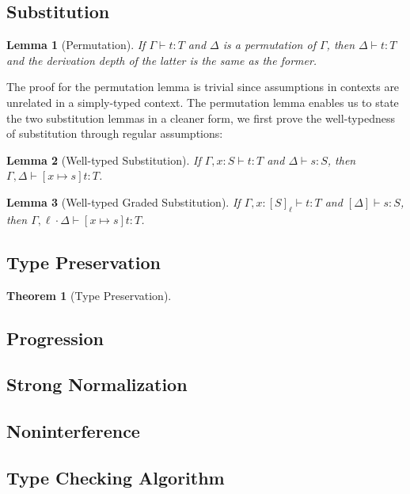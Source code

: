 \documentclass[conference]{IEEEtran}
\newtheorem{theorem}{Theorem}
\newtheorem{lemma}{Lemma}
\begin{document}
\subsection{Substitution}
\label{lem-perm}
\begin{lemma}[Permutation]
	If $\Gamma\vdash t:T$ and $\Delta$ is a permutation of $\Gamma$, then $\Delta\vdash t:T$ and the derivation depth of the latter is the same as the former.
\end{lemma}
The proof for the permutation lemma is trivial since assumptions in contexts are unrelated in a simply-typed context. The permutation lemma enables us to state the two substitution lemmas in a cleaner form, we first prove the well-typedness of substitution through regular assumptions:
\begin{lemma}[Well-typed Substitution] 
	If $\Gamma,x:S\vdash t:T$ and $\Delta\vdash s:S$, then $\Gamma,\Delta\vdash [x\mapsto s]t:T$.
\end{lemma}

\begin{lemma}[Well-typed Graded Substitution] 
	If $\Gamma,x:[S]_\ell\vdash t:T$ and $[\Delta]\vdash s:S$, then $\Gamma,\ell\cdot\Delta\vdash [x\mapsto s]t:T$.
\end{lemma}

\subsection{Type Preservation}
\label{thm-pre}
\begin{theorem}[Type Preservation]
	
\end{theorem}

\subsection{Progression}

\subsection{Strong Normalization}

\subsection{Noninterference}

\subsection{Type Checking Algorithm}
\end{document}
